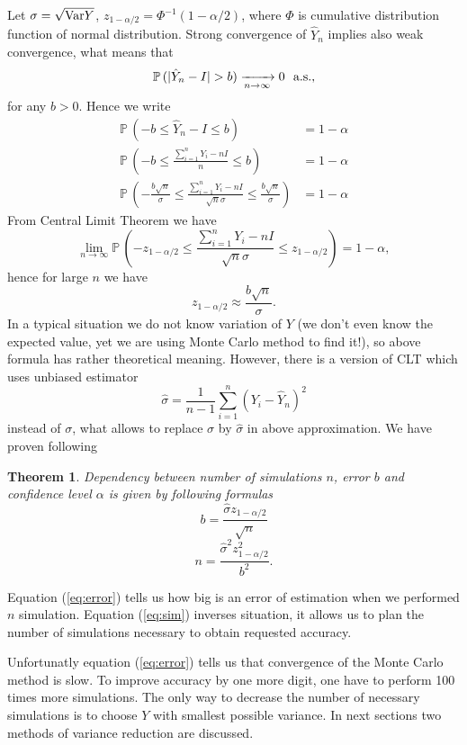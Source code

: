 \documentclass[a4paper,12pt, oneside]{book}
\newtheorem{thm}{Theorem}[chapter]
\theoremstyle{definition}
\theoremstyle{remark}
\def\Var{{\rm Var}}
\def\P{{\mathbb{P}}\,}
\def\conv{\xrightarrow[n \rightarrow \infty]{}}
\def\limn{\lim\limits_{n \rightarrow \infty} }
\begin{document}
Let $\sigma = \sqrt{\Var{Y}}$, $z_{1-\alpha/2} = \Phi^{-1}(1-\alpha/2)$, where $\Phi$ is cumulative distribution function of normal distribution.
Strong convergence of $\hat{Y}_n$ implies also weak convergence, what means that
\[ \P(|\hat{Y}_n - I| > b) \conv 0 \hbox{\ \ a.s.,} \]
for any $b > 0$. 
Hence we write
\begin{align*}
 \P(-b \leq \hat{Y}_n - I \leq b) &= 1 - \alpha\\
 \P(-b \leq \frac{\sum\limits_{i=1}^n Y_i - nI}{n}  \leq b) &= 1 - \alpha\\
 \P(-\frac{b\sqrt{n}}{\sigma} \leq \frac{\sum\limits_{i=1}^n Y_i - nI}{\sqrt{n}\sigma}  \leq \frac{b\sqrt{n}}{\sigma}) &= 1 - \alpha
\end{align*}
From Central Limit Theorem we have
\[ \limn \P(-z_{1-\alpha/2} \leq \frac{\sum\limits_{i=1}^n Y_i - nI}{\sqrt{n}\sigma}  \leq z_{1-\alpha/2}) = 1 - \alpha, \]
hence for large $n$ we have
\[z_{1-\alpha/2} \approx \frac{b\sqrt{n}}{\sigma}.\]
In a typical situation we do not know variation of $Y$ (we don't even know the expected value, yet we are using Monte Carlo method to find it!), so above formula has rather theoretical meaning.
However, there is a version of CLT which uses unbiased estimator
\[ \hat{\sigma} = \frac{1}{n-1}\sum\limits_{i=1}^n (Y_i - \hat{Y}_n)^2 \]
instead of $\sigma$, what allows to replace $\sigma$ by $\hat{\sigma}$ in above approximation. We have proven following 
\begin{thm}
 Dependency between number of simulations $n$, error $b$ and confidence level $\alpha$ is given by following formulas
 \begin{equation}
   \label{eq:error}
   b = \frac{\hat{\sigma} z_{1-\alpha/2}}{\sqrt{n}}
 \end{equation}
 \begin{equation}
   \label{eq:sim}
   n = \frac{\hat{\sigma}^2 z_{1-\alpha/2}^2}{b^2}.
 \end{equation}
\end{thm}
\noindent Equation (\ref{eq:error}) tells us how big is an error of estimation when we performed $n$ simulation. Equation (\ref{eq:sim}) inverses situation, it allows us to plan the number of simulations necessary to obtain requested accuracy.

Unfortunatly equation (\ref{eq:error}) tells us that convergence of the Monte Carlo method is slow. To improve accuracy by one more digit, one have to perform 100 times more simulations. The only way to decrease the number of necessary simulations is to choose $Y$ with smallest possible variance. In next sections two methods of variance reduction are discussed.
\end{document}
